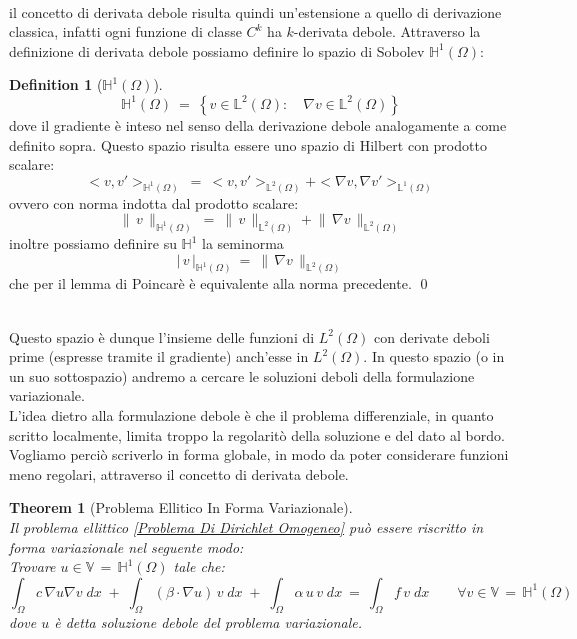 \documentclass[12pt,a4paper]{report}
\theoremstyle{theorem}
\newtheorem{theorem}{Theorem}[section]
\theoremstyle{theorem}
\theoremstyle{definition}
\newtheorem{definition}{Definition}[section]
\providecommand{\abs}[1]{\lvert \, #1 \, \rvert}
\providecommand{\norm}[1]{\lVert \, #1 \, \rVert}
\begin{document}
\hfill \\
il concetto di derivata debole risulta quindi un'estensione a quello di derivazione classica, infatti ogni funzione di classe $C^k$ ha $k$-derivata debole.
Attraverso la definizione di derivata debole possiamo definire lo spazio di Sobolev $\mathbb{H}^{1}(\Omega)$:
\begin{definition} [\textbf{$\mathbb{H}^{1}(\Omega)$}]  \label{Spazio H1}
\hfill \\
\[ \mathbb{H}^{1}(\Omega) \ = \ \left \{ v \in \mathbb{L}^{2}(\Omega): \quad \nabla{v} \in \mathbb{L}^{2}(\Omega) \right \}	\]
dove il gradiente è inteso nel senso della derivazione debole analogamente a come definito sopra. Questo spazio risulta essere uno spazio di Hilbert con prodotto scalare:
\[ < v, v' >_{\mathbb{H}^{1}(\Omega)} \ = \ < v, v' >_{\mathbb{L}^{2}(\Omega)} + < \nabla{v}, \nabla{v}' >_{\mathbb{L}^{1}(\Omega)}\]
ovvero con norma indotta dal prodotto scalare:
\[ \norm{v}_{\mathbb{H}^{1}(\Omega)}\ = \ \norm{v}_{\mathbb{L}^{2}(\Omega)} + \norm{\nabla{v}}_{\mathbb{L}^{2}(\Omega)} \]
inoltre possiamo definire su $\mathbb{H}^{1}$ la seminorma
\[ \abs{v}_{\mathbb{H}^{1}(\Omega)} \ = \  \norm{\nabla{v}}_{\mathbb{L}^{2}(\Omega)} \]
che per il lemma di Poincarè è equivalente alla norma precedente.
\qed
\end{definition}
\hfill \\
Questo spazio è dunque l'insieme delle funzioni di $L^{2}(\Omega)$ con derivate deboli prime (espresse tramite il gradiente) anch'esse in $L^{2}(\Omega)$. In questo spazio (o in un suo sottospazio) andremo a cercare le soluzioni deboli della formulazione variazionale. \\
L'idea dietro alla formulazione debole è che il problema differenziale, in quanto scritto localmente, limita troppo la regolaritò della soluzione e del dato al bordo. Vogliamo perciò scriverlo in forma globale, in modo da poter considerare funzioni meno regolari, attraverso il concetto di derivata debole.
\begin{theorem} [Problema Ellitico In Forma Variazionale]  \label{Problema Ellittico Debole}
\hfill \\
Il problema ellittico \ref{Problema Di Dirichlet Omogeneo} può essere riscritto in forma variazionale nel seguente modo:\\
Trovare $u \in  \mathbb{V} \, = \, \mathbb{H}^{1}(\Omega)$ tale che:
\[ \int_{\Omega}{c \, \nabla u \nabla v \; dx} \; + \; \int_{\Omega}{(\beta \cdot \nabla u) \, v \; dx} \; + \; \int_{\Omega}{\alpha \, u \, v \; dx} \ = \ \int_{\Omega}{f \, v \; dx} \qquad \forall v \in \mathbb{V} \, = \, \mathbb{H}^{1}(\Omega) \]
dove $u$ è detta soluzione debole del problema variazionale.
\end{theorem}
\end{document}

